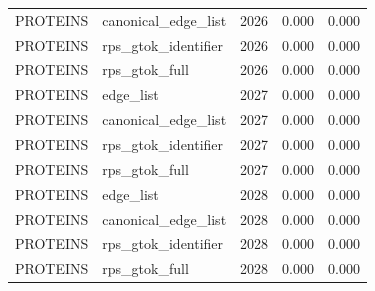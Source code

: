 \begin{table}[t]
\begin{tabular}{llrrr}
PROTEINS & canonical_edge_list & 2026 & 0.000 & 0.000 \\
PROTEINS & rps_gtok_identifier & 2026 & 0.000 & 0.000 \\
PROTEINS & rps_gtok_full & 2026 & 0.000 & 0.000 \\
PROTEINS & edge_list & 2027 & 0.000 & 0.000 \\
PROTEINS & canonical_edge_list & 2027 & 0.000 & 0.000 \\
PROTEINS & rps_gtok_identifier & 2027 & 0.000 & 0.000 \\
PROTEINS & rps_gtok_full & 2027 & 0.000 & 0.000 \\
PROTEINS & edge_list & 2028 & 0.000 & 0.000 \\
PROTEINS & canonical_edge_list & 2028 & 0.000 & 0.000 \\
PROTEINS & rps_gtok_identifier & 2028 & 0.000 & 0.000 \\
PROTEINS & rps_gtok_full & 2028 & 0.000 & 0.000 \\
\bottomrule
\end{tabular}
\end{table}
